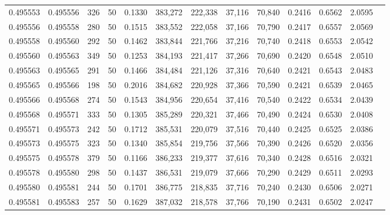 \begin{tabular}{rrrrrrrrrrrrr}
0.495553 & 0.495556 &   326 &  50 &                                     0.1330 & 383,272 & 222,338 &  37,116 &  70,840 & 0.2416 & 0.6562 & 2.0595 \\
0.495556 & 0.495558 &   280 &  50 &                                     0.1515 & 383,552 & 222,058 &  37,166 &  70,790 & 0.2417 & 0.6557 & 2.0569 \\
0.495558 & 0.495560 &   292 &  50 &                                     0.1462 & 383,844 & 221,766 &  37,216 &  70,740 & 0.2418 & 0.6553 & 2.0542 \\
0.495560 & 0.495563 &   349 &  50 &                                     0.1253 & 384,193 & 221,417 &  37,266 &  70,690 & 0.2420 & 0.6548 & 2.0510 \\
0.495563 & 0.495565 &   291 &  50 &                                     0.1466 & 384,484 & 221,126 &  37,316 &  70,640 & 0.2421 & 0.6543 & 2.0483 \\
0.495565 & 0.495566 &   198 &  50 &                                     0.2016 & 384,682 & 220,928 &  37,366 &  70,590 & 0.2421 & 0.6539 & 2.0465 \\
0.495566 & 0.495568 &   274 &  50 &                                     0.1543 & 384,956 & 220,654 &  37,416 &  70,540 & 0.2422 & 0.6534 & 2.0439 \\
0.495568 & 0.495571 &   333 &  50 &                                     0.1305 & 385,289 & 220,321 &  37,466 &  70,490 & 0.2424 & 0.6530 & 2.0408 \\
0.495571 & 0.495573 &   242 &  50 &                                     0.1712 & 385,531 & 220,079 &  37,516 &  70,440 & 0.2425 & 0.6525 & 2.0386 \\
0.495573 & 0.495575 &   323 &  50 &                                     0.1340 & 385,854 & 219,756 &  37,566 &  70,390 & 0.2426 & 0.6520 & 2.0356 \\
0.495575 & 0.495578 &   379 &  50 &                                     0.1166 & 386,233 & 219,377 &  37,616 &  70,340 & 0.2428 & 0.6516 & 2.0321 \\
0.495578 & 0.495580 &   298 &  50 &                                     0.1437 & 386,531 & 219,079 &  37,666 &  70,290 & 0.2429 & 0.6511 & 2.0293 \\
0.495580 & 0.495581 &   244 &  50 &                                     0.1701 & 386,775 & 218,835 &  37,716 &  70,240 & 0.2430 & 0.6506 & 2.0271 \\
0.495581 & 0.495583 &   257 &  50 &                                     0.1629 & 387,032 & 218,578 &  37,766 &  70,190 & 0.2431 & 0.6502 & 2.0247 \\

\end{tabular}
